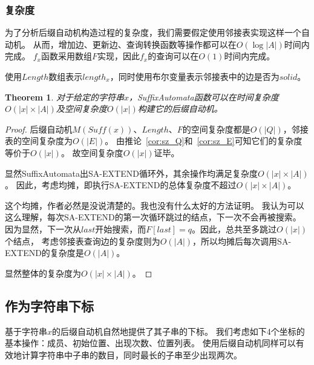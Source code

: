 \documentclass[UTF8]{ctexart}
\newtheorem{thm}{Theorem}[subsection]
\theoremstyle{definition}
\theoremstyle{remark}
\numberwithin{equation}{subsection}
\newcommand{\Suff}{\textit{Suff}}
\begin{document}
	
\subsubsection{复杂度}
\label{subsub:sam_build_complex}

	为了分析后缀自动机构造过程的复杂度，我们需要假定使用邻接表实现这样一个自动机。
	从而，增加边、更新边、查询转换函数等操作都可以在$O(\log |A|)$时间内完成。
	$f_x$函数采用数组$F$实现，因此$f_x$的查询可以在$O(1)$时间内完成。
	
	使用$Length$数组表示$length_x$，同时使用布尔变量表示邻接表中的边是否为$solid$。

	\begin{thm}
	\label{thm:sam_online_construct_complex}
		对于给定的字符串$x$，SuffixAutomata函数可以在时间复杂度$O(|x| \times |A|)$及空间复杂度$O(|x|)$构建它的后缀自动机。
	\end{thm}
	\begin{proof}
		后缀自动机$M(\Suff(x))$、$Length$、$F$的空间复杂度都是$O(|Q|)$，邻接表的空间复杂度为$O(|E|)$。
		由推论~\ref{cor:sz_Q}和~\ref{cor:sz_E}可知它们的复杂度等价于$O(|x|)$。
		故空间复杂度$O(|x|)$证毕。
		
		显然SuffixAutomata出SA-EXTEND循环外，其余操作均满足复杂度$O(|x| \times |A|)$。
		因此，考虑均摊，即执行SA-EXTEND的总体复杂度不超过$O(|x| \times |A|)$。
		
		这个均摊，作者必然是没说清楚的。我也没有什么太好的方法证明。
		我认为可以这么理解，每次SA-EXTEND的第一次循环跳过的结点，下一次不会再被搜索。
		因为显然，下一次从$last$开始搜索，而$F[last] = q$。因此，总共至多跳过$O(|x|)$个结点，
		考虑邻接表查询边的复杂度则为$O(|A|)$，所以均摊后每次调用SA-EXTEND的复杂度是$O(|A|)$。
		
		显然整体的复杂度为$O(|x| \times |A|)$。
	\end{proof}

	
\subsection{作为字符串下标}
\label{sub:as_index}

	基于字符串$x$的后缀自动机自然地提供了其子串的下标。
	我们考虑如下4个坐标的基本操作：成员、初始位置、出现次数、位置列表。
	使用后缀自动机同样可以有效地计算字符串中子串的数目，同时最长的子串至少出现两次。
	
\end{document}
